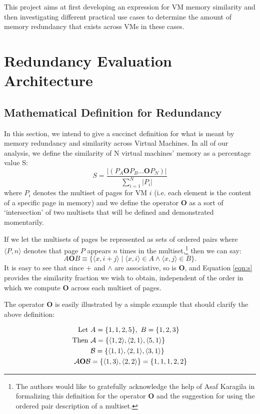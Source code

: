\documentclass{acm_proc_article-sp}
\newcommand{\tup}[1]{\langle #1\rangle}
\begin{document}
This project aims at first developing an expression for VM memory similarity and then investigating different practical use cases to determine the amount of memory redundancy that exists across VMs in these cases. 

\section{Redundancy Evaluation Architecture}\label{sec:redundancy}

\subsection{Mathematical Definition for Redundancy}\label{sec:red_math}
In this section, we intend to give a succinct definition for what is meant by memory redundancy and similarity across Virtual Machines.  In all of our analysis, we define the similarity of N virtual machines' memory as a percentage value S:
\begin{equation}
S = \frac{|(P_A \mathbf{O} P_B ... \mathbf{O} P_N)|}{\sum\limits_{i=1}^{N}|P_i|}
\end{equation}\label{eqn:s}
where $P_i$ denotes the multiset of pages for VM $i$ (i.e. each element is the content of a specific page in memory) and we define the operator $\mathbf{O}$ as a sort of `intersection' of two multisets that will be defined and demonstrated momentarily.  



If we let the multisets of pages be represented as sets of ordered pairs where $\tup{P,n}$ denotes that page $P$ appears $n$ times in the multiset,\footnote{The authors would like to gratefully acknowledge the help of Asaf Karagila in formalizing this definition for the operator $\mathbf{O}$ and the suggestion for using the ordered pair description of a multiset.}
then we can say:
\begin{equation}\label{eqn:s}
A\mathrel{\mathbf{O}}B\equiv\{\tup{x,i+j}\mid\tup{x,i}\in A\land\tup{x,j}\in B\}.
\end{equation}
It is easy to see that since $+$ and $\land$ are associative, so is $\mathbf{O}$, and Equation \ref{eqn:s} provides the similarity fraction we wish to obtain, independent of the order in which we compute $\mathbf{O}$ across each multiset of pages.

The operator $\mathbf{O}$ is easily illustrated by a simple example that should clarify the above definition:

\begin{align*}
\textrm{Let } & A = \{1,1,2,5\},~B = \{1,2,3\}\\
\textrm{Then } &{\cal A} = \{\tup{1,2}, \tup{2,1}, \tup{5,1}\}\\
& {\cal B} = \{\tup{1,1}, \tup{2,1}, \tup{3,1}\}\\
{\cal A} \mathbf{O} {\cal B} &= \{\tup{1,3}, \tup{2,2}\} = \{1,1,1,2,2\}
\end{align*}
\end{document}
